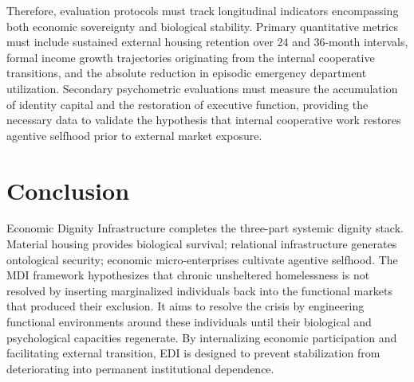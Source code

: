 \documentclass[12pt, letterpaper]{article}
\begin{document}
Therefore, evaluation protocols must track longitudinal indicators encompassing both economic sovereignty and biological stability. Primary quantitative metrics must include sustained external housing retention over 24 and 36-month intervals, formal income growth trajectories originating from the internal cooperative transitions, and the absolute reduction in episodic emergency department utilization. Secondary psychometric evaluations must measure the accumulation of identity capital and the restoration of executive function, providing the necessary data to validate the hypothesis that internal cooperative work restores agentive selfhood prior to external market exposure.

\section{Conclusion}

Economic Dignity Infrastructure completes the three-part systemic dignity stack. Material housing provides biological survival; relational infrastructure generates ontological security; economic micro-enterprises cultivate agentive selfhood. The MDI framework hypothesizes that chronic unsheltered homelessness is not resolved by inserting marginalized individuals back into the functional markets that produced their exclusion. It aims to resolve the crisis by engineering functional environments around these individuals until their biological and psychological capacities regenerate. By internalizing economic participation and facilitating external transition, EDI is designed to prevent stabilization from deteriorating into permanent institutional dependence.

\newpage
{}


\end{document}
